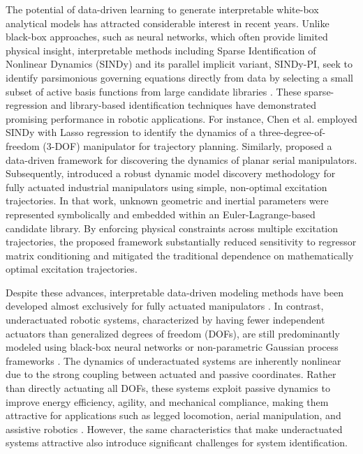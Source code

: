\documentclass[lettersize,journal]{IEEEtran}
\begin{document}
The potential of data-driven learning to generate interpretable white-box analytical models has attracted considerable interest in recent years. Unlike black-box approaches, such as neural networks, which often provide limited physical insight, interpretable methods including Sparse Identification of Nonlinear Dynamics (SINDy) and its parallel implicit variant, SINDy-PI, seek to identify parsimonious governing equations directly from data by selecting a small subset of active basis functions from large candidate libraries \cite{StevenL.Brunton.2016, Kaheman.2020,omar2024robust}. These sparse-regression and library-based identification techniques have demonstrated promising performance in robotic applications. For instance, Chen et al. \cite{Chen.2021} employed SINDy with Lasso regression to identify the dynamics of a three-degree-of-freedom (3-DOF) manipulator for trajectory planning. Similarly, \cite{omar2022framework} proposed a data-driven framework for discovering the dynamics of planar serial manipulators. Subsequently, \cite{omar2024robust} introduced a robust dynamic model discovery methodology for fully actuated industrial manipulators using simple, non-optimal excitation trajectories. In that work, unknown geometric and inertial parameters were represented symbolically and embedded within an Euler-Lagrange-based candidate library. By enforcing physical constraints across multiple excitation trajectories, the proposed framework substantially reduced sensitivity to regressor matrix conditioning and mitigated the traditional dependence on mathematically optimal excitation trajectories.

Despite these advances, interpretable data-driven modeling methods have been developed almost exclusively for fully actuated manipulators \cite{Kaheman.2020, Chu.2020, omar2024robust}. In contrast, underactuated robotic systems, characterized by having fewer independent actuators than generalized degrees of freedom (DOFs), are still predominantly modeled using black-box neural networks or non-parametric Gaussian process frameworks \cite{sintov2019learning, wang2022data}. The dynamics of underactuated systems are inherently nonlinear due to the strong coupling between actuated and passive coordinates. Rather than directly actuating all DOFs, these systems exploit passive dynamics to improve energy efficiency, agility, and mechanical compliance, making them attractive for applications such as legged locomotion, aerial manipulation, and assistive robotics \cite{yang2023concurrent, Fantoni2002}. However, the same characteristics that make underactuated systems attractive also introduce significant challenges for system identification.
\end{document}
